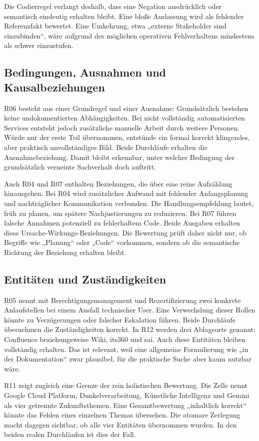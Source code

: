 \documentclass[
  10pt,
  ngerman,
  a4paper,
  toc=graduated,
  numbers=noenddot,
  headings=standardclasses,
  nonumberlist
]{scrartcl}
\begin{document}
Die Codierregel verlangt deshalb, dass eine Negation ausdrücklich oder semantisch eindeutig erhalten bleibt. Eine bloße Auslassung wird als fehlender Referenzfakt bewertet. Eine Umkehrung, etwa „externe Stakeholder sind einzubinden“, wäre aufgrund des möglichen operativen Fehlverhaltens mindestens als schwer einzustufen.

\subsection{Bedingungen, Ausnahmen und Kausalbeziehungen}

R06 besteht aus einer Grundregel und einer Ausnahme: Grundsätzlich bestehen keine undokumentierten Abhängigkeiten. Bei nicht vollständig automatisierten Services entsteht jedoch zusätzliche manuelle Arbeit durch weitere Personen. Würde nur der erste Teil übernommen, entstünde ein formal korrekt klingendes, aber praktisch unvollständiges Bild. Beide Durchläufe erhalten die Ausnahmebeziehung. Damit bleibt erkennbar, unter welcher Bedingung der grundsätzlich verneinte Sachverhalt doch auftritt.

Auch R04 und R07 enthalten Beziehungen, die über eine reine Aufzählung hinausgehen. Bei R04 wird zusätzlicher Aufwand mit fehlender Anfangsplanung und nachträglicher Kommunikation verbunden. Die Handlungsempfehlung lautet, früh zu planen, um spätere Nachjustierungen zu reduzieren. Bei R07 führen falsche Annahmen potenziell zu fehlerhaftem Code. Beide Ausgaben erhalten diese Ursache-Wirkungs-Beziehungen. Die Bewertung prüft daher nicht nur, ob Begriffe wie „Planung“ oder „Code“ vorkommen, sondern ob die semantische Richtung der Beziehung erhalten bleibt.

\subsection{Entitäten und Zuständigkeiten}

R05 nennt mit Berechtigungsmanagement und Rezertifizierung zwei konkrete Anlaufstellen bei einem Ausfall technischer User. Eine Verwechslung dieser Rollen könnte zu Verzögerungen oder falscher Eskalation führen. Beide Durchläufe übernehmen die Zuständigkeiten korrekt. In R12 werden drei Ablageorte genannt: Confluence beziehungsweise Wiki, its360 und sai. Auch diese Entitäten bleiben vollständig erhalten. Das ist relevant, weil eine allgemeine Formulierung wie „in der Dokumentation“ zwar plausibel, für die praktische Suche aber kaum nutzbar wäre.

R11 zeigt zugleich eine Grenze der rein holistischen Bewertung. Die Zelle nennt Google Cloud Platform, Dunkelverarbeitung, Künstliche Intelligenz und Gemini als vier getrennte Zukunftsthemen. Eine Gesamtbewertung „inhaltlich korrekt“ könnte das Fehlen eines einzelnen Themas übersehen. Die atomare Zerlegung macht dagegen sichtbar, ob alle vier Entitäten übernommen wurden. In den beiden realen Durchläufen ist dies der Fall.
\end{document}
